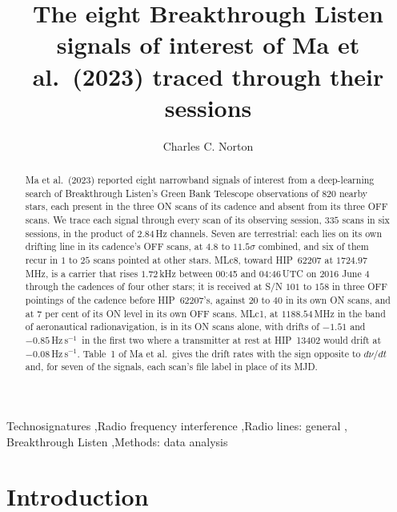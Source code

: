 \documentclass[3p,11pt]{elsarticle}
\newcommand{\hzs}{Hz\,s$^{-1}$}
\begin{document}
\begin{frontmatter}

\title{The eight Breakthrough Listen signals of interest of Ma et al.\ (2023) traced through their sessions}

\author{Charles C. Norton}

\begin{abstract}
Ma et al.\ (2023) reported eight narrowband signals of interest from a deep-learning search of Breakthrough Listen's
Green Bank Telescope observations of 820 nearby stars, each present in the three ON scans of its cadence and absent from
its three OFF scans. We trace each signal through every scan of its observing session, $335$ scans in six sessions, in
the product of $2.84$\,Hz channels. Seven are terrestrial: each lies on its own drifting line in its cadence's OFF
scans, at $4.8$ to $11.5\sigma$ combined, and six of them recur in $1$ to $25$ scans pointed at other stars. MLc8,
toward HIP~62207 at $1724.97$\,MHz, is a carrier that rises $1.72$\,kHz between 00:45 and 04:46\,UTC on 2016 June 4
through the cadences of four other stars; it is received at S/N $101$ to $158$ in three OFF pointings of the cadence before
HIP~62207's, against $20$ to $40$ in its own ON scans, and at $7$ per cent of its ON level in its own OFF scans. MLc1, at
$1188.54$\,MHz in the band of aeronautical radionavigation, is in its ON scans alone, with drifts of $-1.51$ and
$-0.85$\,\hzs\ in the first two where a transmitter at rest at HIP~13402 would drift at $-0.08$\,\hzs. Table~1 of
Ma et al.\ gives the drift rates with the sign opposite to $d\nu/dt$ and, for seven of the signals, each scan's file
label in place of its MJD.
\end{abstract}

\begin{keyword}
Technosignatures \sep Radio frequency interference \sep Radio lines: general \sep
Breakthrough Listen \sep Methods: data analysis
\end{keyword}

\end{frontmatter}

\section{Introduction}\label{sec:intro}
\end{document}
